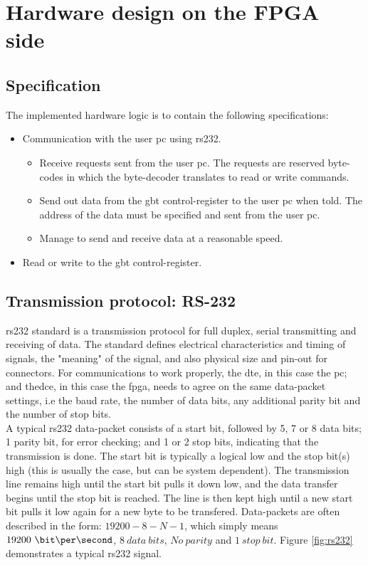 \documentclass[main.tex]{subfiles}
\begin{document}
\chapter{Hardware design on the FPGA side} \label{chap:hardware}

\section{Specification}

The implemented hardware logic is to contain the following specifications:\\
\begin{itemize} \setlength{\itemsep}{10pt}
\item Communication with the user \acrshort{pc} using \acrshort{rs232}.
  \begin{itemize}
  \item Receive requests sent from the user \acrshort{pc}. The requests are reserved byte-codes in which the byte-decoder translates to read or write commands. 
  \item Send out data from the \gls{gbt} control-register to the user \acrshort{pc} when told. The address of the data must be specified and sent from the user \acrshort{pc}.
  \item Manage to send and receive data at a reasonable speed. 
  \end{itemize}
\item Read or write to the \gls{gbt} control-register.
\end{itemize}

\section{Transmission protocol: RS-232}

\acrshort{rs232} standard is a transmission protocol for full duplex, serial transmitting and receiving of data. The standard defines electrical characteristics and timing of signals, the "meaning" of the signal, and also physical size and pin-out for connectors.
For communications to work properly, the \gls{dte}, in this case the \acrshort{pc}; and the\gls{dce}, in this case the \gls{fpga}, needs to agree on the same data-packet settings, i.e the baud rate, the number of data bits, any additional parity bit and the number of stop bits.\\

A typical \acrshort{rs232} data-packet consists of a start bit, followed by 5, 7 or 8 data bits; 1 parity bit, for error checking; and 1 or 2 stop bits, indicating that the transmission is done. The start bit is typically a logical low and the stop bit(s) high (this is usually the case, but can be system dependent). The transmission line remains high until the start bit pulls it down low, and the data transfer begins until the stop bit is reached. The line is then kept high until a new start bit pulls it low again for a new byte to be transfered. Data-packets are often described in the form: $19200-8-N-1$, which simply means $19200~ \bit\per\second$, $8~ data~ bits$, $No~ parity$ and $1~ stop~ bit$. Figure \ref{fig:rs232} demonstrates a typical \acrshort{rs232} signal.\\
\end{document}
